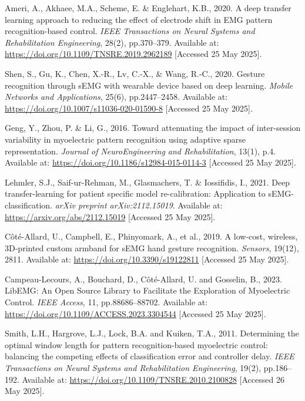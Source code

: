 \begin{multicols}{2}
\begin{thebibliography}{99}
Ameri, A., Akhaee, M.A., Scheme, E. \& Englehart, K.B., 2020. A deep transfer learning approach to reducing the effect of electrode shift in EMG pattern recognition-based control. \textit{IEEE Transactions on Neural Systems and Rehabilitation Engineering}, 28(2), pp.370–379. Available at: \url{https://doi.org/10.1109/TNSRE.2019.2962189} [Accessed 25 May 2025].

Shen, S., Gu, K., Chen, X.-R., Lv, C.-X., \& Wang, R.-C., 2020. Gesture recognition through sEMG with wearable device based on deep learning. \textit{Mobile Networks and Applications}, 25(6), pp.2447–2458. Available at: \url{https://doi.org/10.1007/s11036-020-01590-8} [Accessed 25 May 2025].

Geng, Y., Zhou, P. \& Li, G., 2016. Toward attenuating the impact of inter-session variability in myoelectric pattern recognition using adaptive sparse representation. \textit{Journal of NeuroEngineering and Rehabilitation}, 13(1), p.4. Available at: \url{https://doi.org/10.1186/s12984-015-0114-3} [Accessed 25 May 2025].

Lehmler, S.J., Saif-ur-Rehman, M., Glasmachers, T. \& Iossifidis, I., 2021. Deep transfer-learning for patient specific model re-calibration: Application to sEMG-classification. \textit{arXiv preprint arXiv:2112.15019}. Available at: \url{https://arxiv.org/abs/2112.15019} [Accessed 25 May 2025].

Côté-Allard, U., Campbell, E., Phinyomark, A., et al., 2019. A low-cost, wireless, 3D-printed custom armband for sEMG hand gesture recognition. \textit{Sensors}, 19(12), 2811. Available at: \url{https://doi.org/10.3390/s19122811} [Accessed 25 May 2025].

Campeau-Lecours, A., Bouchard, D., Côté-Allard, U. and Gosselin, B., 2023. LibEMG: An Open Source Library to Facilitate the Exploration of Myoelectric Control. \textit{IEEE Access}, 11, pp.88686–88702. Available at: \url{https://doi.org/10.1109/ACCESS.2023.3304544} [Accessed 25 May 2025].

Smith, L.H., Hargrove, L.J., Lock, B.A. and Kuiken, T.A., 2011. Determining the optimal window length for pattern recognition-based myoelectric control: balancing the competing effects of classification error and controller delay. \textit{IEEE Transactions on Neural Systems and Rehabilitation Engineering}, 19(2), pp.186--192. Available at: \url{https://doi.org/10.1109/TNSRE.2010.2100828} [Accessed 26 May 2025].


\end{thebibliography}
\end{multicols}
